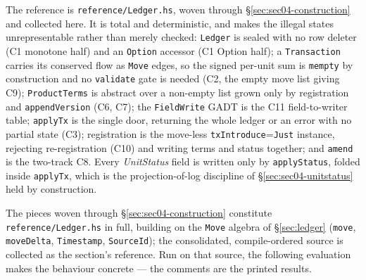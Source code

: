 The reference is \texttt{reference/Ledger.hs}, woven through \S\ref{sec:sec04-construction} and
collected here. It is total and deterministic, and makes the illegal states unrepresentable
rather than merely checked: \texttt{Ledger} is sealed with no row deleter (C1 monotone
half) and an \texttt{Option} accessor (C1 Option half); a \texttt{Transaction} carries its
conserved flow as \texttt{Move} edges, so the signed per-unit sum is \texttt{mempty} by
construction and no \texttt{validate} gate is needed (C2, the empty move list giving C9);
\texttt{ProductTerms} is abstract over a non-empty list grown only by registration and
\texttt{appendVersion} (C6, C7); the \texttt{FieldWrite} GADT is the C11 field-to-writer
table; \texttt{applyTx} is the single door, returning the whole ledger or an error with no
partial state (C3); registration is the move-less \texttt{txIntroduce}=\texttt{Just}
instance, rejecting re-registration (C10) and writing terms and status together; and
\texttt{amend} is the two-track C8. Every \emph{UnitStatus} field is written only by
\texttt{applyStatus}, folded inside \texttt{applyTx}, which is the projection-of-log
discipline of \S\ref{sec:sec04-unitstatus} held by construction.

The pieces woven through \S\ref{sec:sec04-construction} constitute \texttt{reference/Ledger.hs} in
full, building on the \texttt{Move} algebra of \S\ref{sec:ledger}
(\texttt{move}, \texttt{moveDelta}, \texttt{Timestamp}, \texttt{SourceId}); the consolidated,
compile-ordered source is collected as the section's reference. Run on that source, the
following evaluation makes the behaviour concrete --- the comments are the printed results.

